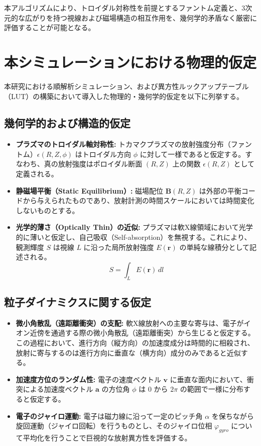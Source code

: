 \documentclass[a4paper,11pt]{bxjsarticle} %
\begin{document}
本アルゴリズムにより、トロイダル対称性を前提とするファントム定義と、3次元的な広がりを持つ視線および磁場構造の相互作用を、幾何学的矛盾なく厳密に評価することが可能となる。

\section{本シミュレーションにおける物理的仮定}
本研究における順解析シミュレーション、および異方性ルックアップテーブル（LUT）の構築において導入した物理的・幾何学的仮定を以下に列挙する。

\subsection{幾何学的および構造的仮定}
\begin{itemize}
    \item \textbf{プラズマのトロイダル軸対称性:}
    トカマクプラズマの放射強度分布（ファントム）$\epsilon(R, Z, \phi)$ はトロイダル方向 $\phi$ に対して一様であると仮定する。すなわち、真の放射強度はポロイダル断面 $(R, Z)$ 上の関数 $\epsilon(R, Z)$ として定義される。
    
    \item \textbf{静磁場平衡（Static Equilibrium）:}
    磁場配位 $\mathbf{B}(R, Z)$ は外部の平衡コードから与えられたものであり、放射計測の時間スケールにおいては時間変化しないものとする。
    
    \item \textbf{光学的薄さ（Optically Thin）の近似:}
    プラズマは軟X線領域において光学的に薄いと仮定し、自己吸収（Self-absorption）を無視する。これにより、観測輝度 $S$ は視線 $L$ に沿った局所放射強度 $E(\mathbf{r})$ の単純な線積分として記述される。
    \begin{equation}
        S = \int_{L} E(\mathbf{r}) \, dl
    \end{equation}
\end{itemize}

\subsection{粒子ダイナミクスに関する仮定}
\begin{itemize}
    \item \textbf{微小角散乱（遠距離衝突）の支配:}
    軟X線放射への主要な寄与は、電子がイオン近傍を通過する際の微小角散乱（遠距離衝突）から生じると仮定する。この過程において、進行方向（縦方向）の加速度成分は時間的に相殺され、放射に寄与するのは進行方向に垂直な（横方向）成分のみであると近似する。
    
    \item \textbf{加速度方位のランダム性:}
    電子の速度ベクトル $\mathbf{v}$ に垂直な面内において、衝突による加速度ベクトル $\mathbf{a}$ の方位角 $\phi$ は $0$ から $2\pi$ の範囲で一様に分布すると仮定する。
    
    \item \textbf{電子のジャイロ運動:}
    電子は磁力線に沿って一定のピッチ角 $\alpha$ を保ちながら旋回運動（ジャイロ回転）を行うものとし、そのジャイロ位相 $\varphi_{gyro}$ について平均化を行うことで巨視的な放射異方性を評価する。
\end{itemize}
\end{document}
